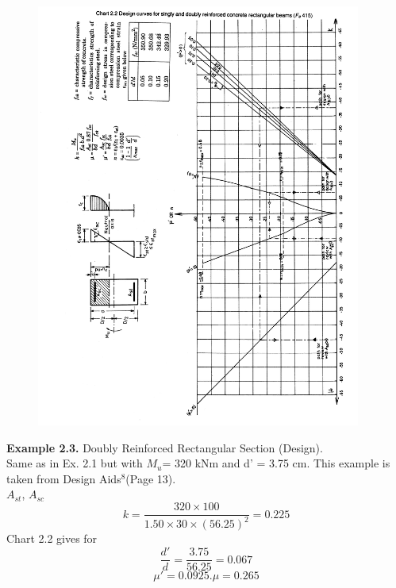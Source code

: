 \begin{figure}
\centering
\includegraphics[width=0.95\textwidth]{images/ch2-6.png}
\caption{}
\label{Values for parameters}
\end{figure}
\newpage
\textbf{Example 2.3.} Doubly Reinforced Rectangular Section (Design).\\
\given Same as in Ex. 2.1 but with ${M_{u}}$= 320 kNm and d’ = 3.75 cm. This example is taken
from Design Aids$^{8}$(Page 13).\\
\required ${A_{st}}$, ${A_{sc}}$
\solution
\begin{equation*}
k=\frac{320 \times 100}{1.50 \times 30 \times (56.25)^2}=0.225
\label{27}
\end{equation*}
Chart 2.2 gives for
\begin{equation*}
\frac{d'}{d}=\frac{3.75}{56.25}=0.067 
\label{28}
\end{equation*}
\begin{equation*}
\mu'=0.0925.\mu=0.265
\label{29}
\end{equation*}
